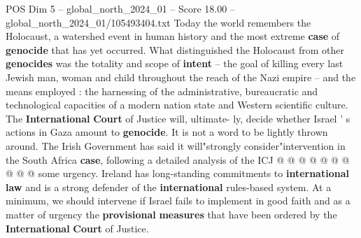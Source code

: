 \begin{textsample}{POS Dim 5 – global\_north\_2024\_01 – Score 18.00 – global\_north\_2024\_01/105493404.txt}
Today the world remembers the Holocaust, a watershed event in human history and the most extreme \textbf{case} of \textbf{genocide} that has yet occurred.
What distinguished the Holocaust from other \textbf{genocides} was the totality and scope of \textbf{intent} -- the goal of killing every last Jewish man, woman and child throughout the reach of the Nazi empire -- and the means employed : the harnessing of the administrative, bureaucratic and technological capacities of a modern nation state and Western scientific culture.
The \textbf{International} \textbf{Court} of Justice will, ultimate- ly, decide whether Israel ' s actions in Gaza amount to \textbf{genocide}.
It is not a word to be lightly thrown around.
The Irish Government has said it will"strongly consider"intervention in the South Africa \textbf{case}, following a detailed analysis of the ICJ @ @ @ @ @ @ @ @ @ @ some urgency.
Ireland has long-standing commitments to \textbf{international} \textbf{law} and is a strong defender of the \textbf{international} rules-based system.
At a minimum, we should intervene if Israel fails to implement in good faith and as a matter of urgency the \textbf{provisional} \textbf{measures} that have been ordered by the \textbf{International} \textbf{Court} of Justice.

\end{textsample}
